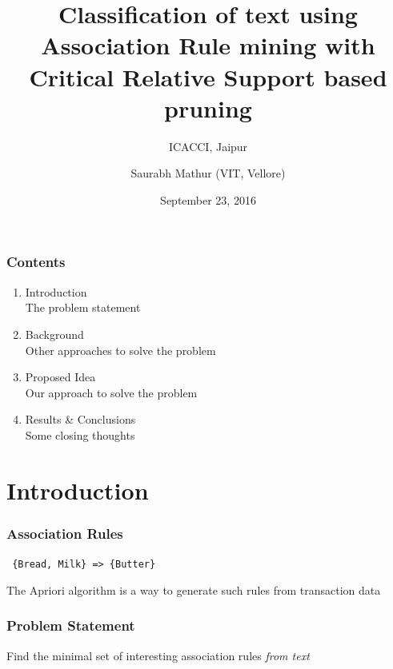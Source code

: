 \documentclass{beamer}
\title{Classification of text using Association Rule mining with Critical Relative Support based pruning}
\subtitle{ICACCI, Jaipur}
\author{Saurabh Mathur (VIT, Vellore)}
\date{September 23, 2016}
\begin{document}
	\setcounter{showProgressBar}{0}
	\setcounter{showSlideNumbers}{0}

	\frame{\titlepage}
	\begin{frame}
		\frametitle{Contents}
		\begin{enumerate}
			\item Introduction \\ \textcolor{ExecusharesGrey}{\footnotesize\hspace{1em} The problem statement}
			\item Background  \\ \textcolor{ExecusharesGrey}{\footnotesize\hspace{1em} Other approaches to solve the problem}
			\item Proposed Idea  \\ \textcolor{ExecusharesGrey}{\footnotesize\hspace{1em} Our approach to solve the problem}
			\item Results \& Conclusions \\ \textcolor{ExecusharesGrey}{\footnotesize\hspace{1em} Some closing thoughts}
		\end{enumerate}
	\end{frame}

	\setcounter{framenumber}{0}
	\setcounter{showProgressBar}{1}
	\setcounter{showSlideNumbers}{1}
	
	\section{Introduction}
		
		\begin{frame}
			\frametitle{Association Rules}
			\begin{center} \LARGE{ \texttt{ \{Bread, Milk\} => \{Butter\} } }  	\end {center}
			\textcolor{ExecusharesGrey}{\footnotesize\hspace{1em} The Apriori algorithm \super{[1]} is a way to generate such rules from transaction data}
		    		
		\end{frame}
		
		
		\begin{frame}
			\frametitle{Problem Statement}
			\begin {center} \huge{Find the minimal set of interesting association rules \textit{from text}}  
			\end {center}
			
		    		
		\end{frame}
		 
\end{document}
